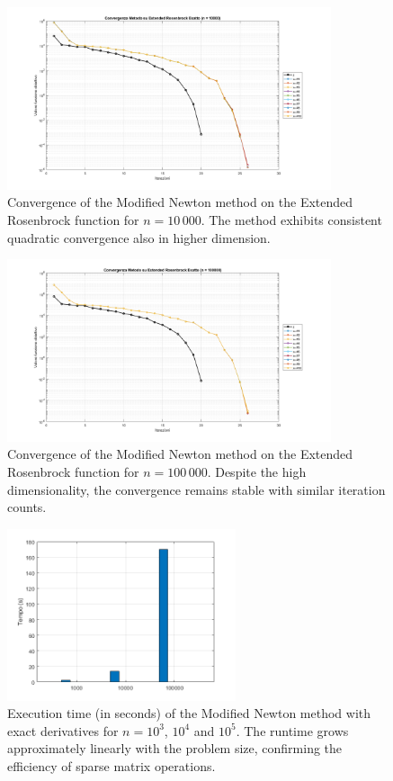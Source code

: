 \documentclass[a4paper,12pt]{article}
\begin{document}
	\begin{figure}[htbp]
		\centering
		\includegraphics[width=0.85\textwidth]{../immagini/ext_10k.png}
		\caption{Convergence of the Modified Newton method on the Extended Rosenbrock function for $n=10\,000$. The method exhibits consistent quadratic convergence also in higher dimension.}
		\label{fig:extnewton_10k}
	\end{figure}
	
	\begin{figure}[htbp]
		\centering
		\includegraphics[width=0.85\textwidth]{../immagini/ext_100k.png}
		\caption{Convergence of the Modified Newton method on the Extended Rosenbrock function for $n=100\,000$. Despite the high dimensionality, the convergence remains stable with similar iteration counts.}
		\label{fig:extnewton_100k}
	\end{figure}
	
	\begin{figure}[htbp]
		\centering
		\includegraphics[width=0.6\textwidth]{../immagini/ext_time.png}
		\caption{Execution time (in seconds) of the Modified Newton method with exact derivatives for $n=10^3$, $10^4$ and $10^5$. The runtime grows approximately linearly with the problem size, confirming the efficiency of sparse matrix operations.}
		\label{fig:extnewton_times}
	\end{figure}
	
\end{document}
